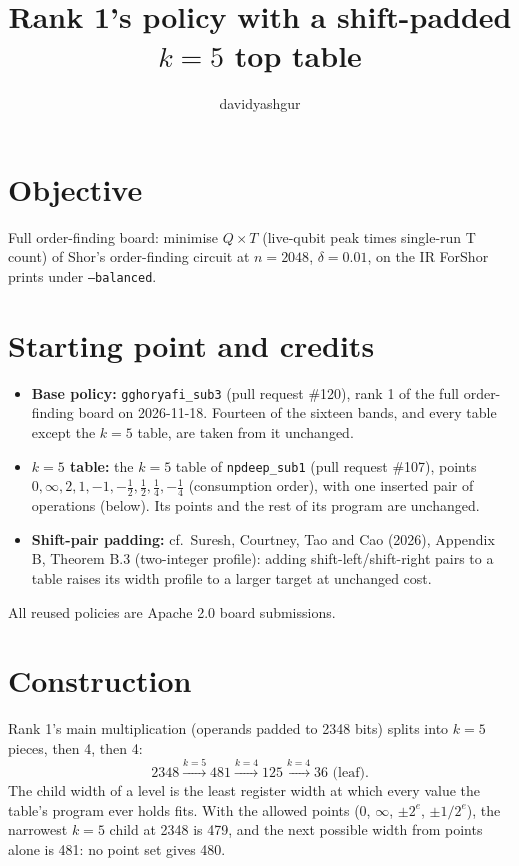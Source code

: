 \documentclass[11pt]{article}
\title{Rank 1's policy with a shift-padded $k=5$ top table}
\author{davidyashgur}
\date{}
\begin{document}
\maketitle

\section*{Objective}
Full order-finding board: minimise $Q \times T$ (live-qubit peak times single-run T count) of Shor's
order-finding circuit at $n = 2048$, $\delta = 0.01$, on the IR ForShor prints under \texttt{--balanced}.

\section*{Starting point and credits}
\begin{itemize}
  \item \textbf{Base policy:} \texttt{gghoryafi\_sub3} (pull request \#120), rank 1 of the full order-finding board
        on 2026-11-18. Fourteen of the sixteen bands, and every table except the $k=5$ table, are taken from it unchanged.
  \item \textbf{$k=5$ table:} the $k=5$ table of \texttt{npdeep\_sub1} (pull request \#107), points
        $0, \infty, 2, 1, -1, -\tfrac12, \tfrac12, \tfrac14, -\tfrac14$ (consumption order), with one inserted
        pair of operations (below). Its points and the rest of its program are unchanged.
  \item \textbf{Shift-pair padding:} cf.\ Suresh, Courtney, Tao and Cao (2026), Appendix B, Theorem B.3
        (two-integer profile): adding shift-left/shift-right pairs to a table raises its width profile to a larger
        target at unchanged cost.
\end{itemize}
All reused policies are Apache 2.0 board submissions.

\section*{Construction}
Rank 1's main multiplication (operands padded to 2348 bits) splits into $k = 5$ pieces, then 4, then 4:
\[ 2348 \xrightarrow{k=5} 481 \xrightarrow{k=4} 125 \xrightarrow{k=4} 36 \text{ (leaf)}. \]
The child width of a level is the least register width at which every value the table's program ever holds fits.
With the allowed points (0, $\infty$, $\pm 2^e$, $\pm 1/2^e$), the narrowest $k=5$ child at 2348 is 479, and the
next possible width from points alone is 481: no point set gives 480.
\end{document}
